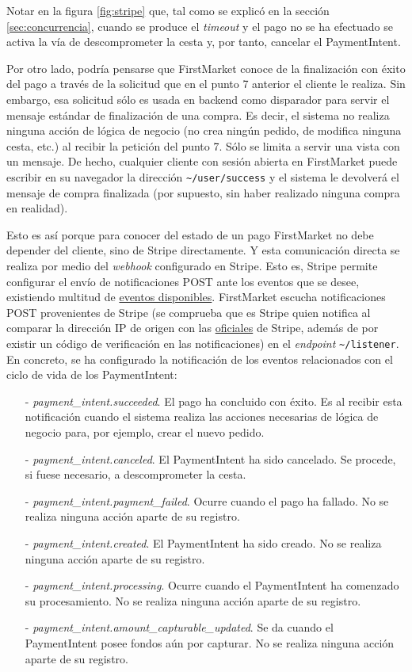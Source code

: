 \documentclass[a4paper]{article}
\begin{document}
    Notar en la figura \ref{fig:stripe} que, tal como se explicó en la sección \ref{sec:concurrencia}, cuando se produce el \emph{timeout} y el pago no se ha efectuado se activa la vía de descomprometer la cesta y, por tanto, cancelar el PaymentIntent.
    
    Por otro lado, podría pensarse que FirstMarket conoce de la finalización con éxito del pago a través de la solicitud que en el punto 7 anterior el cliente le realiza. Sin embargo, esa solicitud sólo es usada en backend como disparador para servir el mensaje estándar de finalización de una compra. Es decir, el sistema no realiza ninguna acción de lógica de negocio (no crea ningún pedido, de modifica ninguna cesta, etc.) al recibir la petición del punto 7. Sólo se limita a servir una vista con un mensaje. De hecho, cualquier cliente con sesión abierta en FirstMarket puede escribir en su navegador la dirección \nolinkurl{~/user/success} y el sistema le devolverá el mensaje de compra finalizada (por supuesto, sin haber realizado ninguna compra en realidad).
    
    Esto es así porque para conocer del estado de un pago FirstMarket no debe depender del cliente, sino de Stripe directamente. Y esta comunicación directa se realiza por medio del \emph{webhook} configurado en Stripe. Esto es, Stripe permite configurar el envío de notificaciones POST ante los eventos que se desee, existiendo multitud de \href{https://stripe.com/docs/api/events/types}{eventos disponibles}. FirstMarket escucha notificaciones POST provenientes de Stripe (se comprueba que es Stripe quien notifica al comparar la dirección IP de origen con las \href{https://stripe.com/docs/ips}{oficiales} de Stripe, además de por existir un código de verificación en las notificaciones) en el \emph{endpoint} \nolinkurl{~/listener}. En concreto, se ha configurado la notificación de los eventos relacionados con el ciclo de vida de los PaymentIntent:
    
    \begin{itemize}
    	\item[-] \emph{payment\_intent.succeeded}. El pago ha concluido con éxito. Es al recibir esta notificación cuando el sistema realiza las acciones necesarias de lógica de negocio para, por ejemplo, crear el nuevo pedido.
    	\item[-] \emph{payment\_intent.canceled}. El PaymentIntent ha sido cancelado. Se procede, si fuese necesario, a descomprometer la cesta.
    	\item[-] \emph{payment\_intent.payment\_failed}. Ocurre cuando el pago ha fallado. No se realiza ninguna acción aparte de su registro.
    	\item[-] \emph{payment\_intent.created}. El PaymentIntent ha sido creado. No se realiza ninguna acción aparte de su registro.
    	\item[-] \emph{payment\_intent.processing}. Ocurre cuando el PaymentIntent ha comenzado su procesamiento. No se realiza ninguna acción aparte de su registro.
    	\item[-] \emph{payment\_intent.amount\_capturable\_updated}. Se da cuando el PaymentIntent posee fondos aún por capturar. No se realiza ninguna acción aparte de su registro.
    \end{itemize}
    
\end{document}
